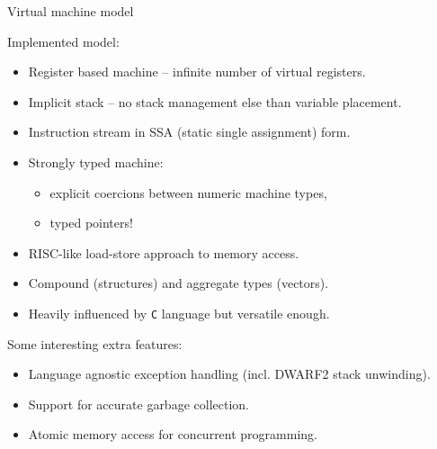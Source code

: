 \documentclass[8pt]{beamer}
\begin{document}
\begin{frame}[fragile]{Virtual machine model}
  \begin{block}{Implemented model:}
    \begin{itemize}
      \item Register based machine -- infinite number of virtual registers.
      \item Implicit stack -- no stack management else than variable placement.
      \item Instruction stream in SSA (static single assignment) form.
      \item Strongly typed machine:
        \begin{itemize}
          \item explicit coercions between numeric machine types,
          \item typed pointers!
        \end{itemize}
      \item RISC-like load-store approach to memory access.
      \item Compound (structures) and aggregate types (vectors).
      \item Heavily influenced by \verb+C+ language but versatile enough.
    \end{itemize}
  \end{block}
  
  \begin{block}{Some interesting extra features:}
    \begin{itemize}
      \item Language agnostic exception handling (incl. DWARF2 stack unwinding).
      \item Support for accurate garbage collection.
      \item Atomic memory access for concurrent programming.
    \end{itemize}
  \end{block}
\end{frame}
\end{document}
